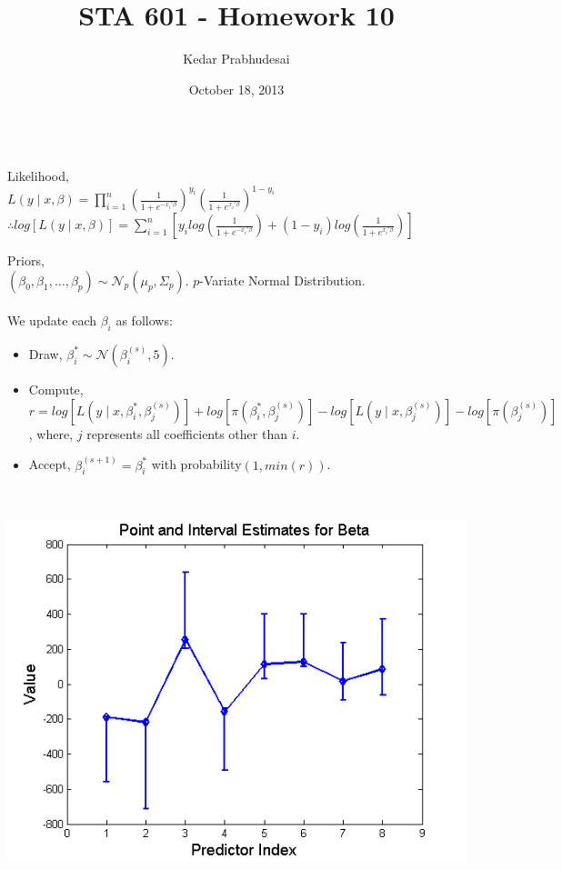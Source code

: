 \documentclass{article}
\title{STA 601 - Homework 10}
\author{Kedar Prabhudesai}
\date{October 18, 2013}
\begin{document}
\maketitle

\\

Likelihood,\\

$L(y \mid x,\beta) = \prod_{i=1}^{n}{\left(\frac{1}{1+e^{-x_i'\beta}}\right)^{y_i}\left(\frac{1}{1+e^{x_i'\beta}}\right)^{1-y_i}}$\\
$\therefore log[L(y \mid x,\beta)] = \sum_{i=1}^{n}{\left[y_i log\left(\frac{1}{1+e^{-x_i'\beta}}\right) + (1-y_i)log\left(\frac{1}{1+e^{x_i'\beta}}\right)\right]}$

Priors,\\
$\left(\beta_0,\beta_1,\ldots,\beta_p\right) \sim \mathcal{N}_p(\mu_p,\Sigma_p)$. $p$-Variate Normal Distribution.\\

\\

We update each $\beta_i$ as follows:\\

\begin{itemize}
\item Draw, $\beta_i^* \sim \mathcal{N}(\beta_i^{(s)},5).$
\item Compute, $r = log[L(y \mid x,\beta_i^*,\beta_j^{(s)})] + log[\pi(\beta_i^*,\beta_j^{(s)})] - log[L(y \mid x,\beta_j^{(s)})] - log[\pi(\beta_j^{(s)})]$, where, $j$ represents all coefficients other than $i$.
\item Accept, $\beta_i^{(s+1)} = \beta_i^*$ with probability$\left(1,min(r)\right)$.\\
\end{itemize}

\\

\begin{center}
\includegraphics[scale=0.5]{BetaResults.png}\\
\end{center}

\pagebreak
{}\\

\end{document}

